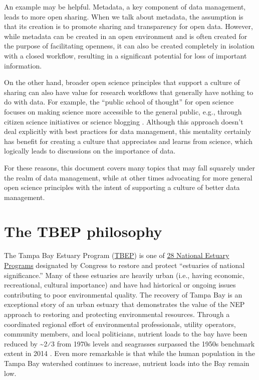 \documentclass[
]{book}
\begin{document}
An example may be helpful. Metadata, a key component of data management, leads to more open sharing. When we talk about metadata, the assumption is that its creation is to promote sharing and transparency for open data. However, while metadata can be created in an open environment and is often created for the purpose of facilitating openness, it can also be created completely in isolation with a closed workflow, resulting in a significant potential for loss of important information.

On the other hand, broader open science principles that support a culture of sharing can also have value for research workflows that generally have nothing to do with data. For example, the ``public school of thought'' for open science focuses on making science more accessible to the general public, e.g., through citizen science initiatives or science blogging \citep{Fecher14}. Although this approach doesn't deal explicitly with best practices for data management, this mentality certainly has benefit for creating a culture that appreciates and learns from science, which logically leads to discussions on the importance of data.

For these reasons, this document covers many topics that may fall squarely under the realm of data management, while at other times advocating for more general open science principles with the intent of supporting a culture of better data management.

\hypertarget{philogeneral}{%
\section{The TBEP philosophy}\label{philogeneral}}

The Tampa Bay Estuary Program (\href{https://www.tbep.org}{TBEP}) is one of \href{http://nationalestuaries.org/}{28 National Estuary Programs} designated by Congress to restore and protect ``estuaries of national significance.'' Many of these estuaries are heavily urban (i.e., having economic, recreational, cultural importance) and have had historical or ongoing issues contributing to poor environmental quality. The recovery of Tampa Bay is an exceptional story of an urban estuary that demonstrates the value of the NEP approach to restoring and protecting environmental resources. Through a coordinated regional effort of environmental professionals, utility operators, community members, and local politicians, nutrient loads to the bay have been reduced by \textasciitilde2⁄3 from 1970s levels and seagrasses surpassed the 1950s benchmark extent in 2014 \citep{Greening14, Sherwood17}. Even more remarkable is that while the human population in the Tampa Bay watershed continues to increase, nutrient loads into the Bay remain low.
\end{document}
